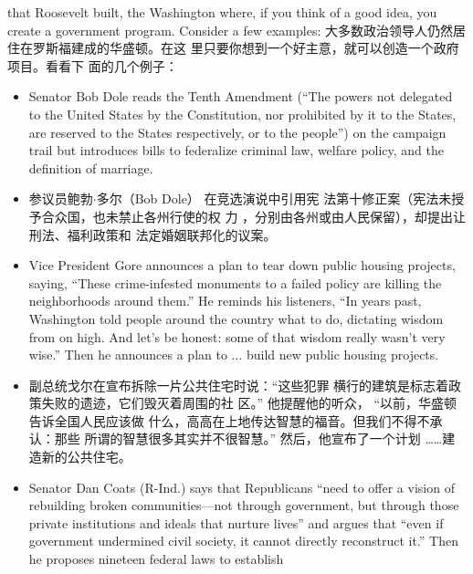 \begin{paracol}{2}
that Roosevelt built, the Washington where, if you think of a
good idea, you create a government program. Consider a few
examples:
\switchcolumn
大多数政治领导人仍然居住在罗斯福建成的华盛顿。在这
里只要你想到一个好主意，就可以创造一个政府项目。看看下
面的几个例子：
\switchcolumn*
\begin{itemize}
	\item Senator Bob Dole reads the Tenth Amendment (``The powers
	not delegated to the United States by the Constitution, nor
	prohibited by it to the States, are reserved to the States respectively, or to the people'') on the campaign trail but introduces bills to federalize criminal law, welfare policy, and the
	definition of marriage.
\end{itemize}
\switchcolumn
\begin{itemize}
	\item 参议员鲍勃$\cdot$多尔（Bob Dole） 在竞选演说中引用宪
	法第十修正案（宪法未授予合众国，也未禁止各州行使的权
	力 ，分别由各州或由人民保留），却提出让刑法、福利政策和
	法定婚姻联邦化的议案。
\end{itemize}
\switchcolumn*
\begin{itemize}
	\item Vice President Gore announces a plan to tear down public
	housing projects, saying, ``These crime-infested monuments
	to a failed policy are killing the neighborhoods around
	them.'' He reminds his listeners, ``In years past, Washington
	told people around the country what to do, dictating wisdom
	from on high. And let's be honest: some of that wisdom really wasn't very wise.'' Then he announces a plan to $\ldots$ build
	new public housing projects.
\end{itemize}
\switchcolumn
\begin{itemize}
	\item 副总统戈尔在宣布拆除一片公共住宅时说：“这些犯罪
	横行的建筑是标志着政策失败的遗迹，它们毁灭着周围的社
	区。” 他提醒他的听众， “以前，华盛顿告诉全国人民应该做
	什么，高高在上地传达智慧的福音。但我们不得不承认：那些
	所谓的智慧很多其实并不很智慧。” 然后，他宣布了一个计划
	……建造新的公共住宅。
\end{itemize}
\switchcolumn*
\begin{itemize}
	\item Senator Dan Coats (R-Ind.) says that Republicans ``need to
	offer a vision of rebuilding broken communities---not
	through government, but through those private institutions
	and ideals that nurture lives'' and argues that ``even if government undermined civil society, it cannot directly reconstruct it.'' Then he proposes nineteen federal laws to establish

\end{itemize}
\end{paracol}

